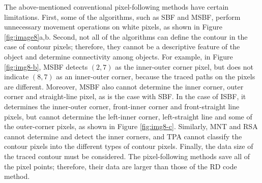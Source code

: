 \documentclass[sensors,article,accept,moreauthors,pdftex,10pt,a4paper]{mdpi}
\begin{document}

The above-mentioned conventional pixel-following methods have certain limitations. First, some of the algorithms, such as SBF and MSBF, perform unnecessary movement operations on white pixels, as shown in Figure \ref{fig:image8}a,b. Second, not all of the algorithms can define the contour in the case of contour pixels; therefore, they cannot be a descriptive feature of the object and determine connectivity among objects. For example, in Figure \ref{fig:img8-b}, MSBF detects $(2, 7)$ as the inner-outer corner pixel, but does not indicate $(8, 7)$ as an inner-outer corner, because the traced paths on the pixels are different. Moreover, MSBF also cannot determine the inner corner, outer corner and straight-line pixel, as is the case with SBF. In the case of ISBF, it determines the inner-outer corner, front-inner corner and front-straight line pixels, but cannot determine the left-inner corner, left-straight line and some of the outer-corner pixels, as shown in Figure \ref{fig:img8-c}. Similarly, MNT and RSA cannot determine and detect the inner corners, and TPA cannot classify the contour pixels into the different types of contour pixels. Finally, the data size of the traced contour must be considered. The pixel-following methods save all of the pixel points; therefore, their data are larger than those of the RD code method.
\end{document}
